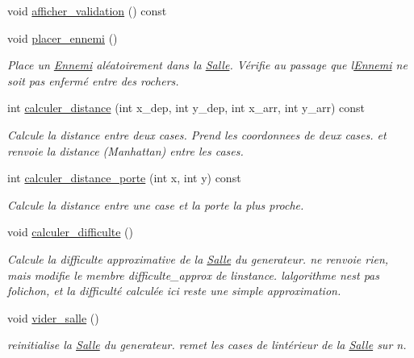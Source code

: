 \begin{DoxyCompactItemize}
void \hyperlink{classSalleGen_a4fa92d03c7c2f229bce396fa42f2d11b}{afficher\+\_\+validation} () const 
\item 
void \hyperlink{classSalleGen_a9e155f263ee5860503a1bce0c505e66e}{placer\+\_\+ennemi} ()
\begin{DoxyCompactList}\small\item\em Place un \hyperlink{classEnnemi}{Ennemi} aléatoirement dans la \hyperlink{classSalle}{Salle}. Vérifie au passage que l\textquotesingle{}\hyperlink{classEnnemi}{Ennemi} ne soit pas enfermé entre des rochers. \end{DoxyCompactList}\item 
int \hyperlink{classSalleGen_a4d9d4c826e88ca738af490ce24e8fef3}{calculer\+\_\+distance} (int x\+\_\+dep, int y\+\_\+dep, int x\+\_\+arr, int y\+\_\+arr) const 
\begin{DoxyCompactList}\small\item\em Calcule la distance entre deux cases. Prend les coordonnees de deux cases. et renvoie la distance (Manhattan) entre les cases. \end{DoxyCompactList}\item 
int \hyperlink{classSalleGen_a15acfd886516fe233da483a8187de2b5}{calculer\+\_\+distance\+\_\+porte} (int x, int y) const 
\begin{DoxyCompactList}\small\item\em Calcule la distance entre une case et la porte la plus proche. \end{DoxyCompactList}\item 
void \hyperlink{classSalleGen_a3e0f8cb7dd106e669b1bc119a8dfcca1}{calculer\+\_\+difficulte} ()
\begin{DoxyCompactList}\small\item\em Calcule la difficulte approximative de la \hyperlink{classSalle}{Salle} du generateur. ne renvoie rien, mais modifie le membre {\itshape difficulte\+\_\+approx} de l\textquotesingle{}instance. l\textquotesingle{}algorithme n\textquotesingle{}est pas folichon, et la difficulté calculée ici reste une simple approximation. \end{DoxyCompactList}\item 
void \hyperlink{classSalleGen_a0a90f415bbad64af48d117ac6ec32fc2}{vider\+\_\+salle} ()
\begin{DoxyCompactList}\small\item\em reinitialise la \hyperlink{classSalle}{Salle} du generateur. remet les cases de l\textquotesingle{}intérieur de la \hyperlink{classSalle}{Salle} sur \textquotesingle{}n\textquotesingle{}. \end{DoxyCompactList}\item 

\end{DoxyCompactItemize}
